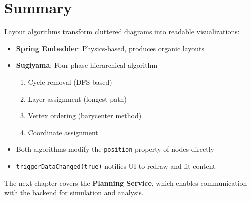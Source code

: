 \section{Summary}
\label{sec:layout-summary}

Layout algorithms transform cluttered diagrams into readable visualizations:

\begin{itemize}
    \item \textbf{Spring Embedder}: Physics-based, produces organic layouts
    \item \textbf{Sugiyama}: Four-phase hierarchical algorithm
    \begin{enumerate}
        \item Cycle removal (DFS-based)
        \item Layer assignment (longest path)
        \item Vertex ordering (barycenter method)
        \item Coordinate assignment
    \end{enumerate}
    \item Both algorithms modify the \texttt{position} property of nodes directly
    \item \texttt{triggerDataChanged(true)} notifies UI to redraw and fit content
\end{itemize}

The next chapter covers the \textbf{Planning Service}, which enables communication with the backend for simulation and analysis.
